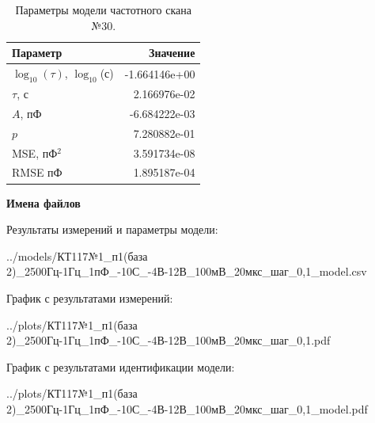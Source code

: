 \begin{table}[!ht]
    \centering
    \caption{Параметры модели частотного скана №30.}
    \begin{tabular}{|l|r|}
        \hline
        Параметр                                       & Значение                  \\ \hline
        $\log_{10}(\tau)$, $\log_{10}$(с)              & -1.664146e+00             \\ \hline
        $\tau$, с                                      & 2.166976e-02              \\ \hline
        $A$, пФ                                        & -6.684222e-03             \\ \hline
        $p$                                            & 7.280882e-01              \\ \hline
        MSE, пФ$^2$                                    & 3.591734e-08              \\ \hline
        RMSE пФ                                        & 1.895187e-04              \\ \hline
    \end{tabular}
    \label{table:frequency_scan_model_30}
\end{table}

\textbf{Имена файлов}

Результаты измерений и параметры модели:

\scriptsize../models/КТ117№1\_п1(база 2)\_2500Гц-1Гц\_1пФ\_-10С\_-4В-12В\_100мВ\_20мкс\_шаг\_0,1\_model.csv
\normalsize

График с результатами измерений:

\scriptsize../plots/КТ117№1\_п1(база 2)\_2500Гц-1Гц\_1пФ\_-10С\_-4В-12В\_100мВ\_20мкс\_шаг\_0,1.pdf
\normalsize

График с результатами идентификации модели:

\scriptsize../plots/КТ117№1\_п1(база 2)\_2500Гц-1Гц\_1пФ\_-10С\_-4В-12В\_100мВ\_20мкс\_шаг\_0,1\_model.pdf
\normalsize

